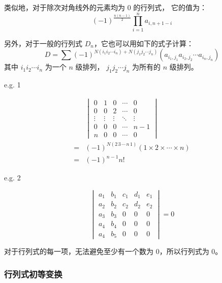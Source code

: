 \documentclass[UTF8]{article}
\begin{document}
	类似地，对于除次对角线外的元素均为 $0$ 的行列式，
	它的值为：
	$$
	(-1)^{\frac {n(n - 1)} {2}} \prod_{i = 1}^{n} a_{i, n + 1 - i}
	$$

	\bigskip

	另外，对于一般的行列式 $D_n$，它也可以用如下的式子计算：
	\begin{equation*}
		D = \sum (-1)^{N(i_1 i_2 \cdots i_n) + N(j_1 j_2 \cdots j_n)}
		(a_{i_1, j_1} a_{i_2, j_2} \cdots a_{i_n, j_n})
	\end{equation*}
	其中 $i_1 i_2 \cdots i_n$ 为一个 $n$ 级排列，
	$j_1 j_2 \cdots j_n$ 为所有的 $n$ 级排列。

	\bigskip


	e.g. 1

	\begin{align*}
		&
		\begin{vmatrix}
			0 & 1 & 0 & \cdots & 0
			\\
			0 & 0 & 2 & \cdots & 0
			\\
			\vdots & \vdots & \vdots & \ddots & \vdots
			\\
			0 & 0 & 0 & \cdots & n - 1
			\\
			n & 0 & 0 & \cdots & 0
		\end{vmatrix}
		\\=&
		(-1)^{N(2 \, 3 \, \cdots \, n \, 1)} (1 \times 2 \times \cdots \times n)
		\\=&
		(-1)^{n - 1} n!
	\end{align*}

	\bigskip

	e.g. 2

	\begin{equation*}
		\begin{vmatrix}
		a_1 & b_1 & c_1 & d_1 & e_1
		\\
		a_2 & b_2 & c_2 & d_2 & e_2
		\\
		a_3 & b_3 & 0 & 0 & 0
		\\
		a_4 & b_4 & 0 & 0 & 0
		\\
		a_4 & b_5 & 0 & 0 & 0
		\end{vmatrix}
		= 0
	\end{equation*}

	对于行列式的每一项，无法避免至少有一个数为 $0$，所以行列式为 $0$。

	\subsubsection{行列式初等变换}
\end{document}
